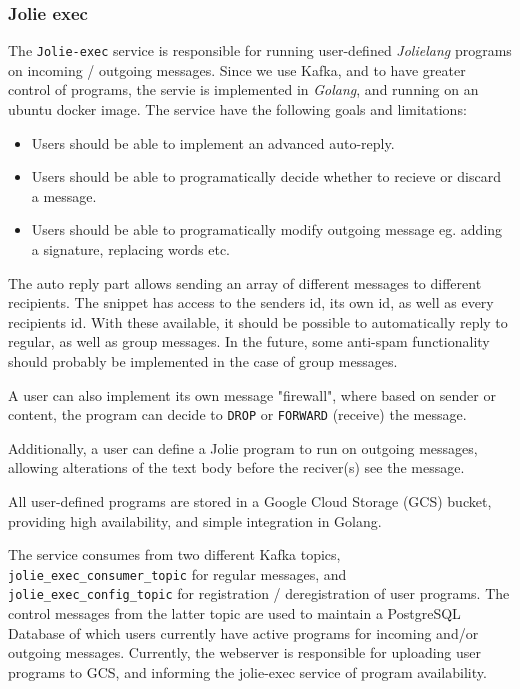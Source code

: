 \subsubsection{Jolie exec}
The \texttt{Jolie-exec} service is responsible for running user-defined \textit{Jolielang} programs on incoming / outgoing messages. 
Since we use Kafka, and to have greater control of programs, the servie is implemented in \textit{Golang}, and running on an ubuntu docker image.
The service have the following goals and limitations:
\begin{itemize}
    \item Users should be able to implement an advanced auto-reply.
    \item Users should be able to programatically decide whether to recieve or discard a message.
    \item Users should be able to programatically modify outgoing message eg. adding a signature, replacing words etc.
\end{itemize}

The auto reply part allows sending an array of different messages to different recipients. 
The snippet has access to the senders id, its own id, as well as every recipients id.
With these available, it should be possible to automatically reply to regular, as well as group messages.
In the future, some anti-spam functionality should probably be implemented in the case of group messages.

A user can also implement its own message "firewall", where based on sender or content, the program can decide to \texttt{DROP} or \texttt{FORWARD} (receive) the message.

Additionally, a user can define a Jolie program to run on outgoing messages, allowing alterations of the text body before the reciver(s) see the message.

\medskip

All user-defined programs are stored in a Google Cloud Storage (GCS) bucket, providing high availability, and simple integration in Golang.

The service consumes from two different Kafka topics, \texttt{jolie\_exec\_consumer\_topic} for regular messages, and \texttt{jolie\_exec\_config\_topic} for registration / deregistration of user programs.
The control messages from the latter topic are used to maintain a PostgreSQL Database of which users currently have active programs for incoming and/or outgoing messages.
Currently, the webserver is responsible for uploading user programs to GCS, and informing the jolie-exec service of program availability.


